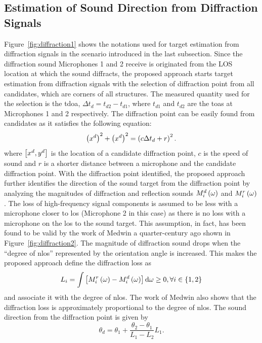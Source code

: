 \documentclass[letterpaper, 10 pt, conference]{ieeeconf}  %
\begin{document}
\subsection{Estimation of Sound Direction from Diffraction Signals} Figure~\ref{fig:diffraction1} shows the notations used for target estimation from diffraction signals in the scenario introduced in the last subsection.  Since the diffraction sound Microphones 1 and 2 receive is originated from the LOS location at which the sound diffracts, the proposed approach starts target estimation from diffraction signals with the selection of diffraction point from all candidates, which are corners of all structures.  The measured quantity used for the selection is the \gls{tdoa}, $\Delta t_d = t_{d2} - t_{d1}$, where $t_{d1}$ and $t_{d2}$ are the \glspl{toa} at Microphones 1 and 2 respectively.  The diffraction point can be easily found from candidates as it satisfies the following equation:  
\begin{equation}\label{eq:TDOA1}
\left ( x^d \right )^2 + \left ( x^d \right )^2 = \left ( c \Delta t_d + r \right )^2.  
\end{equation}
where $\left [ x^d, y^d \right ]$ is the location of a candidate diffraction point, $c$ is the speed of sound and $r$ is a shorter distance between a microphone and the candidate diffraction point.  
With the diffraction point identified, the proposed approach further identifies the direction of the sound target from the diffraction point by analyzing the magnitudes of diffraction and reflection sounds $M_i^d\left ( \omega \right )$ and $M_i^r\left ( \omega \right )$.  The loss of high-frequency signal components is assumed to be less with a microphone closer to \gls{los} (Microphone 2 in this case) as there is no loss with a microphone on the \gls{los} to the sound target.  This assumption, in fact, has been found to be valid by the work of Medwin a quarter-century ago \cite{medwin1981shadowing} shown in Figure~\ref{fig:diffraction2}.  The magnitude of diffraction sound drops when the ``degree of \gls{nlos}'' represented by the orientation angle is increased.   This makes the proposed approach define the diffraction loss as
\begin{equation}\label{eq:loss}
L_i = \int \left [ M_i^r\left ( \omega \right ) - M_i^d\left ( \omega \right ) \right ] {\rm d} \omega \geq 0, \forall i \in \left \{ 1,2 \right \}  
\end{equation}
and associate it with the degree of \gls{nlos}.  The work of Medwin also shows that the diffraction loss is approximately proportional to the degree of \gls{nlos}.  The sound direction from the diffraction point is given by
\begin{equation}\label{eq:direction_diffraction}
\theta_d = \theta_1 + \frac{\theta_2 - \theta_1}{L_1 - L_2} L_1.   
\end{equation}
\end{document}
